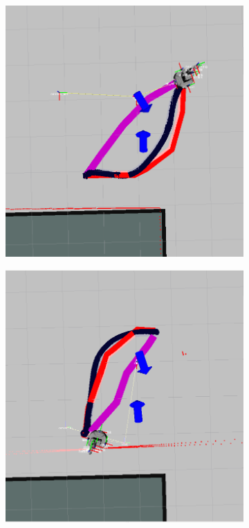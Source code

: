 \documentclass{article}  %
\begin{document}
			\begin{figure}[tbh]
	\centering
      \begin{subfigure}[b]{0.42\columnwidth}
    \includegraphics[scale=0.15]{images/real_good2.png}
    \caption{}
    \label{fig:res_real1}
  \end{subfigure}
  \hspace{10mm}
  \begin{subfigure}[b]{0.42\columnwidth}
  \hspace{4mm}
    \includegraphics[scale=0.15]{images/real_good4.png}

\end{subfigure}
\end{figure}
\end{document}
